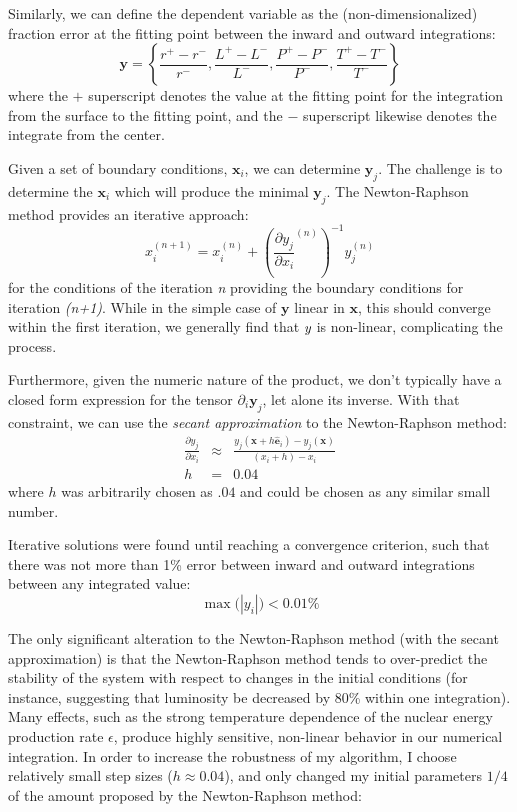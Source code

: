 Similarly, we can define the dependent variable as the (non-dimensionalized) fraction error at the fitting point between the inward and outward integrations:
\begin{equation}
  \mathbf{y} = \left\{\frac{r^+ - r^-}{r^-}, \frac{L^+ - L^-}{L^-}, \frac{P^+ - P^-}{P^-}, \frac{T^+ - T^-}{T^-} \right\}
\end{equation}
where the $+$ superscript denotes the value at the fitting point for the integration from the surface to the fitting point, and the $-$ superscript likewise denotes the integrate from the center.

Given a set of boundary conditions, $\mathbf{x}_i$, we can determine $\mathbf{y}_j$. The challenge is to determine the $\mathbf{x}_i$ which will produce the minimal $\mathbf{y}_j$.  The Newton-Raphson method provides an iterative approach:
\begin{equation}
  x_i^{(n+1)} = x_i^{(n)} + \left(\frac{\partial y_j}{\partial x_i}^{(n)}\right)^{-1} y_j^{(n)}
\end{equation}
for the conditions of the iteration \emph{n} providing the boundary conditions for iteration \emph{(n+1)}. While in the simple case of $\mathbf{y}$ linear in $\mathbf{x}$, this should converge within the first iteration, we generally find that $\emph{y}$ is non-linear, complicating the process.

Furthermore, given the numeric nature of the product, we don't typically have a closed form expression for the tensor $\partial_i \mathbf{y}_j$, let alone its inverse.  With that constraint, we can use the \emph{secant approximation} to the Newton-Raphson method:
\begin{eqnarray}
  \frac{\partial y_j}{\partial x_i}  &\approx& \frac{y_j(\mathbf{x} + h \mathbf{\hat{e}}_i ) - y_j(\mathbf{x})}{(x_i + h) - x_i} \\
  h &=& 0.04 \nonumber
\end{eqnarray}
where $h$ was arbitrarily chosen as $.04$ and could be chosen as any similar small number.

Iterative solutions were found until reaching a convergence criterion, such that there was not more than 1\% error between inward and outward integrations between any integrated value:
\begin{equation}
   \max{(\left|y_i\right|}) < 0.01\%
\end{equation}

The only significant alteration to the Newton-Raphson method (with the secant approximation) is that the Newton-Raphson method tends to over-predict the stability of the system with respect to changes in the initial conditions (for instance, suggesting that luminosity be decreased by 80\% within one integration). Many effects, such as the strong temperature dependence of the nuclear energy production rate $\epsilon$, produce highly sensitive, non-linear behavior in our numerical integration.  In order to increase the robustness of my algorithm, I choose relatively small step sizes ($h \approx 0.04$), and only changed my initial parameters $1/4$ of the amount proposed by the Newton-Raphson method:

